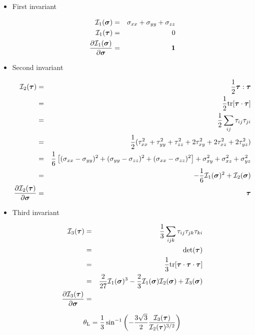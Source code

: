 \begin{itemize}
\item First invariant %

\begin{eqnarray}
{\cal I}_1(\bm\sigma) &=& \sigma_{xx}+\sigma_{yy}+\sigma_{zz} \nonumber\\
{\cal I}_1(\bm\tau) &=& 0 \nonumber\\ 
\frac{\partial {\cal I}_1(\bm\sigma)}{\partial \bm\sigma} &=& {\bm 1}  \nonumber
\end{eqnarray}


\item Second invariant %


\begin{eqnarray}
{\cal I}_2(\bm\tau) 
&=& \frac12 {\bm \tau}:{\bm \tau} \nonumber\\
&=& \frac12 {\rm tr} [{\bm \tau}\cdot {\bm \tau}] \nonumber\\
&=& \frac12 \sum_{ij} \tau_{ij}\tau_{ji}  \nonumber\\
&=& \frac12 ( \tau_{xx}^2 + \tau_{yy}^2 +\tau_{zz}^2 + 2\tau_{xy}^2+ 2\tau_{xz}^2+ 2\tau_{yz}^2) \nonumber\\
&=& \frac{1}{6}\left[(\sigma_{xx}-\sigma_{yy})^2 + (\sigma_{yy}-\sigma_{zz})^2 
+ (\sigma_{xx}-\sigma_{zz})^2 \right]  + \sigma_{xy}^2 + \sigma_{xz}^2 + \sigma_{yz}^2 \nonumber\\
&=&  -\frac16 {\cal I}_1(\bm\sigma)^2 + {\cal I}_2(\bm\sigma) \nonumber\\
\frac{\partial {\cal I}_2(\bm\tau)}{\partial \bm\sigma} &=& \bm\tau   \nonumber
\end{eqnarray}

\item Third invariant %

\begin{eqnarray}
{\cal I}_3(\bm\tau) 
&=& \frac13 \sum_{ijk} \tau_{ij}\tau_{jk}\tau_{ki} \nonumber\\
&=& {\rm det}(\bm\tau) \nonumber\\
&=& \frac13 {\rm tr} [{\bm \tau}\cdot {\bm \tau} \cdot {\bm \tau}] \nonumber\\
&=& \frac{2}{27}  {\cal I}_1(\bm\sigma)^3 - \frac23{\cal I}_1(\bm\sigma) {\cal I}_2(\bm\sigma)
+{\cal I}_3(\bm\sigma) \nonumber\\
\frac{\partial {\cal I}_3(\bm\tau)}{\partial \bm\sigma} &=&
\end{eqnarray}

\begin{equation}
\theta_{\rm L}=\frac{1}{3} \sin^{-1} 
\left( -\frac{3\sqrt{3}}{2} \frac{{\cal I}_3({\bm \tau})}{{\cal I}_2({\bm \tau})^{3/2}} \right)
\label{eq:lodang}
\end{equation}


\end{itemize}


